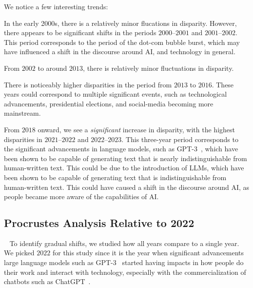 We notice a few interesting trends:
\begin{enumroman}
  \item In the early 2000s, there is a relatively minor flucations in disparity.
    However, there appears to be significant shifts in the periods
    $2000$--$2001$ and $2001$--$2002$.
    This period corresponds to the period of the dot-com bubble burst, which may have influenced
    a shift in the discourse around AI, and technology in general.
  \item From $2002$ to around $2013$, there is relatively minor fluctuations in disparity.
  \item There is noticeably higher disparities in the period from $2013$ to $2016$.
    These years could correspond to multiple significant events, such as technological advancements,
    presidential elections, and social-media becoming more mainstream.
  \item From $2018$ onward, we see a \emph{significant} increase in disparity,
    with the highest disparities in $2021$--$2022$ and $2022$--$2023$.
    This three-year period corresponds to the significant advancements in
    language models, such as GPT-3~\cite{gpt3-paper},
    which have been shown to be capable of generating text that is nearly indistinguishable
    from human-written text.
    This could be due to the introduction of LLMs, which have been shown to be
    capable of generating text that is indistinguishable from human-written text.
    This could have caused a shift in the discourse around AI, as people
    became more aware of the capabilities of AI.
\end{enumroman}

\subsection{Procrustes Analysis Relative to 2022}~\label{subsec:procrustes-2022}
To identify gradual shifts, we studied how all years compare to a single year.
We picked $2022$ for this study since it is the year when significant advancements
large language models such as GPT-3~\cite{gpt3-paper} started having
impacts in how people do their work and interact with technology,
especially with the commercialization of chatbots such as
ChatGPT~\cite{chatgpt-info}.

